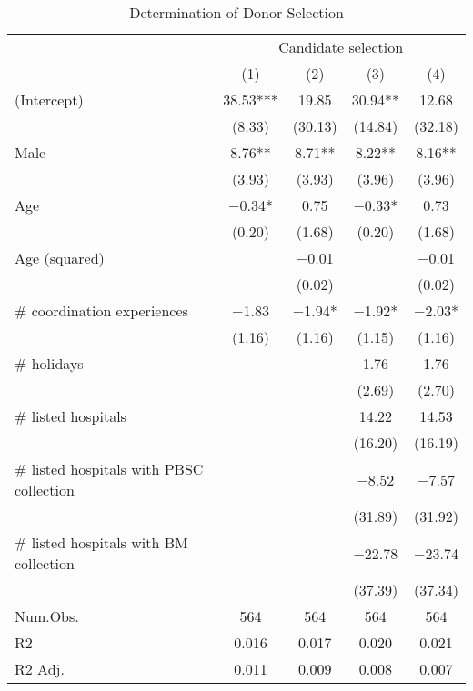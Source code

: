\documentclass[12pt, a4paper]{article}
\begin{document}
\begin{table}[H]

\caption{\label{tab:lm-who-selected}Determination of Donor Selection}
\centering
\fontsize{8}{10}\selectfont
\begin{threeparttable}
\begin{tabular}[t]{lcccc}
\toprule
\multicolumn{1}{c}{ } & \multicolumn{4}{c}{Candidate selection} \\
\cmidrule(l{3pt}r{3pt}){2-5}
  & (1) & (2) & (3) & (4)\\
\midrule
(Intercept) & \num{38.53}*** & \num{19.85} & \num{30.94}** & \num{12.68}\\
 & (\num{8.33}) & (\num{30.13}) & (\num{14.84}) & (\num{32.18})\\
Male & \num{8.76}** & \num{8.71}** & \num{8.22}** & \num{8.16}**\\
 & (\num{3.93}) & (\num{3.93}) & (\num{3.96}) & (\num{3.96})\\
Age & \num{-0.34}* & \num{0.75} & \num{-0.33}* & \num{0.73}\\
 & (\num{0.20}) & (\num{1.68}) & (\num{0.20}) & (\num{1.68})\\
Age (squared) &  & \num{-0.01} &  & \num{-0.01}\\
 &  & (\num{0.02}) &  & (\num{0.02})\\
\# coordination experiences & \num{-1.83} & \num{-1.94}* & \num{-1.92}* & \num{-2.03}*\\
 & (\num{1.16}) & (\num{1.16}) & (\num{1.15}) & (\num{1.16})\\
\# holidays &  &  & \num{1.76} & \num{1.76}\\
 &  &  & (\num{2.69}) & (\num{2.70})\\
\# listed hospitals &  &  & \num{14.22} & \num{14.53}\\
 &  &  & (\num{16.20}) & (\num{16.19})\\
\# listed hospitals with PBSC collection &  &  & \num{-8.52} & \num{-7.57}\\
 &  &  & (\num{31.89}) & (\num{31.92})\\
\# listed hospitals with BM collection &  &  & \num{-22.78} & \num{-23.74}\\
 &  &  & (\num{37.39}) & (\num{37.34})\\
\midrule
Num.Obs. & \num{564} & \num{564} & \num{564} & \num{564}\\
R2 & \num{0.016} & \num{0.017} & \num{0.020} & \num{0.021}\\
R2 Adj. & \num{0.011} & \num{0.009} & \num{0.008} & \num{0.007}\\

\end{tabular}
\end{threeparttable}
\end{table}
\end{document}
